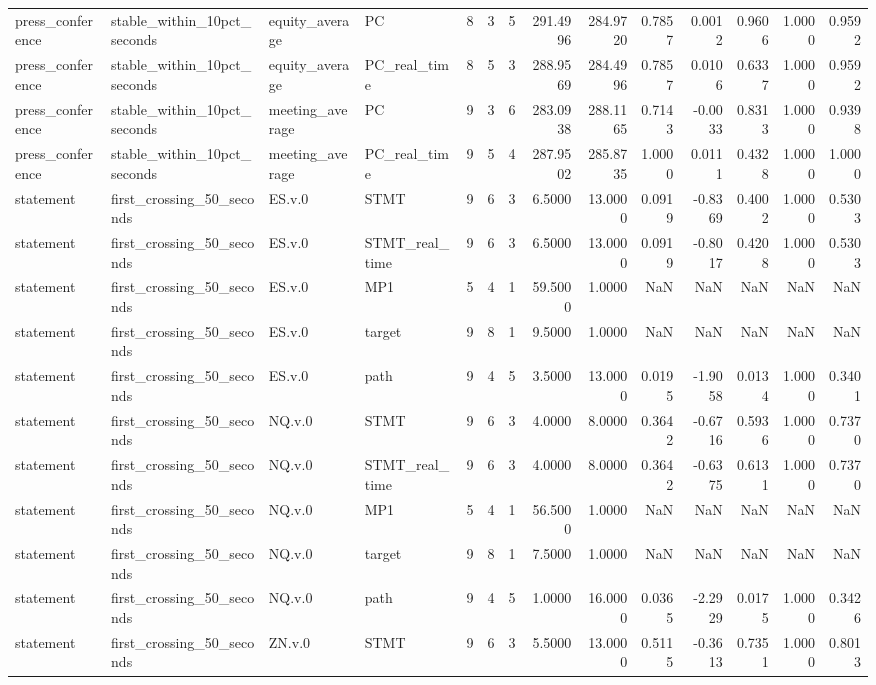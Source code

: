 \begin{tabular}{llllrrrrrrrrrr}
press_conference & stable_within_10pct_seconds & equity_average & PC & 8 & 3 & 5 & 291.4996 & 284.9720 & 0.7857 & 0.0012 & 0.9606 & 1.0000 & 0.9592 \\
press_conference & stable_within_10pct_seconds & equity_average & PC_real_time & 8 & 5 & 3 & 288.9569 & 284.4996 & 0.7857 & 0.0106 & 0.6337 & 1.0000 & 0.9592 \\
press_conference & stable_within_10pct_seconds & meeting_average & PC & 9 & 3 & 6 & 283.0938 & 288.1165 & 0.7143 & -0.0033 & 0.8313 & 1.0000 & 0.9398 \\
press_conference & stable_within_10pct_seconds & meeting_average & PC_real_time & 9 & 5 & 4 & 287.9502 & 285.8735 & 1.0000 & 0.0111 & 0.4328 & 1.0000 & 1.0000 \\
statement & first_crossing_50_seconds & ES.v.0 & STMT & 9 & 6 & 3 & 6.5000 & 13.0000 & 0.0919 & -0.8369 & 0.4002 & 1.0000 & 0.5303 \\
statement & first_crossing_50_seconds & ES.v.0 & STMT_real_time & 9 & 6 & 3 & 6.5000 & 13.0000 & 0.0919 & -0.8017 & 0.4208 & 1.0000 & 0.5303 \\
statement & first_crossing_50_seconds & ES.v.0 & MP1 & 5 & 4 & 1 & 59.5000 & 1.0000 & NaN & NaN & NaN & NaN & NaN \\
statement & first_crossing_50_seconds & ES.v.0 & target & 9 & 8 & 1 & 9.5000 & 1.0000 & NaN & NaN & NaN & NaN & NaN \\
statement & first_crossing_50_seconds & ES.v.0 & path & 9 & 4 & 5 & 3.5000 & 13.0000 & 0.0195 & -1.9058 & 0.0134 & 1.0000 & 0.3401 \\
statement & first_crossing_50_seconds & NQ.v.0 & STMT & 9 & 6 & 3 & 4.0000 & 8.0000 & 0.3642 & -0.6716 & 0.5936 & 1.0000 & 0.7370 \\
statement & first_crossing_50_seconds & NQ.v.0 & STMT_real_time & 9 & 6 & 3 & 4.0000 & 8.0000 & 0.3642 & -0.6375 & 0.6131 & 1.0000 & 0.7370 \\
statement & first_crossing_50_seconds & NQ.v.0 & MP1 & 5 & 4 & 1 & 56.5000 & 1.0000 & NaN & NaN & NaN & NaN & NaN \\
statement & first_crossing_50_seconds & NQ.v.0 & target & 9 & 8 & 1 & 7.5000 & 1.0000 & NaN & NaN & NaN & NaN & NaN \\
statement & first_crossing_50_seconds & NQ.v.0 & path & 9 & 4 & 5 & 1.0000 & 16.0000 & 0.0365 & -2.2929 & 0.0175 & 1.0000 & 0.3426 \\
statement & first_crossing_50_seconds & ZN.v.0 & STMT & 9 & 6 & 3 & 5.5000 & 13.0000 & 0.5115 & -0.3613 & 0.7351 & 1.0000 & 0.8013 \\

\end{tabular}
